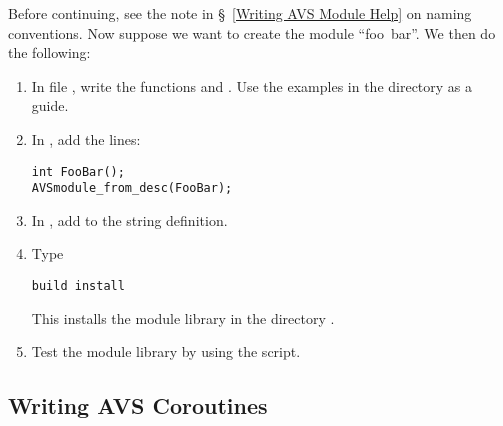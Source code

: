 Before continuing, see the note in \S~\ref{Writing AVS Module Help}
on naming conventions.
Now suppose we want to create the module ``foo~bar''.
We then do the following:
\begin{enumerate}

\item
In file , write the functions  and
.
Use the examples in the  directory as a guide.

\item
In , add the lines:
\begin{display}\begin{verbatim}
int FooBar();
AVSmodule_from_desc(FooBar);
\end{verbatim}\end{display}

\item
In , add  to the  string definition.

\item
Type
\begin{display}\begin{verbatim}
build install
\end{verbatim}\end{display}
This installs the module library in the directory
.

\item
Test the module library by using the  script.

\end{enumerate}


\subsection{Writing AVS Coroutines}
\label{Writing AVS Coroutines}

